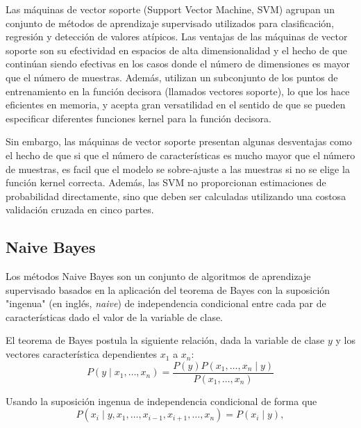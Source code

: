 
Las máquinas de vector soporte (Support Vector Machine, SVM) agrupan un conjunto de métodos de aprendizaje supervisado utilizados para clasificación, regresión y detección de valores atípicos. Las ventajas de las máquinas de vector soporte son su efectividad en espacios de alta dimensionalidad y el hecho de que continúan siendo efectivas en los casos donde el número de dimensiones es mayor que el número de muestras.
Además, utilizan un subconjunto de los puntos de entrenamiento en la función decisora (llamados vectores soporte), lo que los hace eficientes en memoria, y acepta gran versatilidad en el sentido de que se pueden especificar diferentes funciones kernel para la función decisora.

Sin embargo, las máquinas de vector soporte presentan algunas desventajas como el hecho de que si que el número de características es mucho mayor que el número de muestras, es facil que el modelo se sobre-ajuste a las muestras si no se elige la función kernel correcta. 
Además, las SVM no proporcionan estimaciones de probabilidad directamente, sino que deben ser calculadas utilizando una costosa validación cruzada en cinco partes.

\subsection{Naive Bayes}


Los métodos Naive Bayes son un conjunto de algoritmos de aprendizaje supervisado basados en la aplicación del teorema de Bayes con la suposición "ingenua" (en inglés, \emph{naive}) de independencia condicional entre cada par de características dado el valor de la variable de clase. 

El teorema de Bayes postula la siguiente relación, dada la variable de clase $y$ y los vectores característica dependientes $x_{1}$ a $x_{n}$:
\begin{equation*}
    P(y \mid x_{1},\dots,x_{n}) = \dfrac{P(y)P(x_{1},\dots,x_{n}\mid y)}{P(x_{1},\dots,x_{n})}
\end{equation*}

Usando la suposición ingenua de independencia condicional de forma que
\begin{equation*}
    P(x_{i} \mid y,x_{1},\dots,x_{i-1},x_{i+1},\dots,x_{n})=P(x_{i}\mid y),
\end{equation*}

